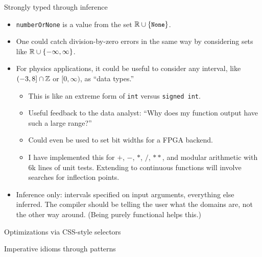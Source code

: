 \documentclass{beamer}
\begin{document}
\begin{frame}{Strongly typed through inference}
\vspace{0.3 cm}
\begin{itemize}
\item<1-> {\tt \small numberOrNone} is a value from the set $\Bbb{R} \cup \{\mbox{\tt \small None}\}$.

\item<2-> One could catch division-by-zero errors in the same way by considering sets like $\Bbb{R} \cup \{-\infty, \infty\}$.

\item<3-> For physics applications, it could be useful to consider any interval, like $(-3, 8] \cap \Bbb{Z}$ or $[0, \infty)$, as ``data types.''
\begin{itemize}
\item<4-> This is like an extreme form of {\tt \small int} versus {\tt \small signed int}.
\item<4-> Useful feedback to the data analyst: ``Why does my function output have such a large range?''
\item<4-> Could even be used to set bit widths for a FPGA backend.
\item<4-> I have implemented this for $+$, $-$, $*$, $/$, $**$, and modular arithmetic with 6k lines of unit tests. Extending to continuous functions will involve searches for inflection points.
\end{itemize}
\item<5-> Inference only: intervals specified on input arguments, everything else inferred. The compiler should be telling the user what the domains are, not the other way around. (Being purely functional helps this.)
\end{itemize}
\end{frame}

\begin{frame}{Optimizations via CSS-style selectors}
\end{frame}

\begin{frame}{Imperative idioms through patterns}
\end{frame}
\end{document}
